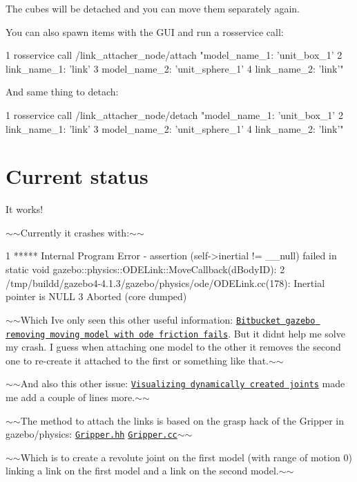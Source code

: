 The cubes will be detached and you can move them separately again.

You can also spawn items with the G\+UI and run a rosservice call\+: 
\begin{DoxyCode}
1 rosservice call /link\_attacher\_node/attach "model\_name\_1: 'unit\_box\_1'
2 link\_name\_1: 'link'
3 model\_name\_2: 'unit\_sphere\_1'
4 link\_name\_2: 'link'"
\end{DoxyCode}


And same thing to detach\+: 
\begin{DoxyCode}
1 rosservice call /link\_attacher\_node/detach "model\_name\_1: 'unit\_box\_1'
2 link\_name\_1: 'link'
3 model\_name\_2: 'unit\_sphere\_1'
4 link\_name\_2: 'link'"
\end{DoxyCode}


\section*{Current status}

It works!

$\sim$$\sim$\+Currently it crashes with\+:$\sim$$\sim$


\begin{DoxyCode}
1 ***** Internal Program Error - assertion (self->inertial != \_\_null) failed in static void
       gazebo::physics::ODELink::MoveCallback(dBodyID):
2 /tmp/buildd/gazebo4-4.1.3/gazebo/physics/ode/ODELink.cc(178): Inertial pointer is NULL
3 Aborted (core dumped)
\end{DoxyCode}


$\sim$$\sim$\+Which I\textquotesingle{}ve only seen this other useful information\+: \href{https://bitbucket.org/osrf/gazebo/issues/1177/removing-moving-model-with-ode-friction}{\tt Bitbucket gazebo removing moving model with ode friction fails}. But it didn\textquotesingle{}t help me solve my crash. I guess when attaching one model to the other it removes the second one to re-\/create it attached to the first or something like that.$\sim$$\sim$

$\sim$$\sim$\+And also this other issue\+: \href{https://bitbucket.org/osrf/gazebo/issues/1077/visualizing-dynamically-created-joints}{\tt Visualizing dynamically created joints} made me add a couple of lines more.$\sim$$\sim$

$\sim$$\sim$\+The method to attach the links is based on the grasp hack of the Gripper in gazebo/physics\+: \href{https://bitbucket.org/osrf/gazebo/src/1d1e3a542af81670f43a120e1df7190592bc4c0f/gazebo/physics/Gripper.hh?at=default&fileviewer=file-view-default}{\tt Gripper.\+hh} \href{https://bitbucket.org/osrf/gazebo/src/1d1e3a542af81670f43a120e1df7190592bc4c0f/gazebo/physics/Gripper.cc?at=default&fileviewer=file-view-default}{\tt Gripper.\+cc}$\sim$$\sim$

$\sim$$\sim$\+Which is to create a revolute joint on the first model (with range of motion 0) linking a link on the first model and a link on the second model.$\sim$$\sim$ 